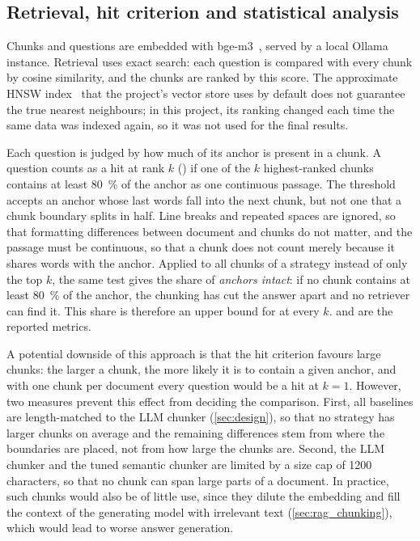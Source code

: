 \subsection{Retrieval, hit criterion and statistical analysis}
\label{sec:stats}

Chunks and questions are embedded with bge-m3~\cite{chen2024bgem3}, served by a local
Ollama instance. Retrieval uses exact search: each question is compared with every chunk
by cosine similarity, and the chunks are ranked by this score. The approximate HNSW
index~\cite{malkov2020hnsw} that the project's vector store uses by default does not
guarantee the true nearest neighbours; in this project, its ranking changed each time the
same data was indexed again, so it was not used for the final results.

Each question is judged by how much of its anchor is present in a chunk. A question counts
as a hit at rank $k$ () if one of the $k$ highest-ranked chunks contains at least
\SI{80}{\percent} of the anchor as one continuous passage. The threshold accepts an anchor
whose last words fall into the next chunk, but not one that a chunk boundary splits in
half. Line breaks and repeated spaces are ignored, so that formatting differences between
document and chunks do not matter, and the passage must be continuous, so that a chunk
does not count merely because it shares words with the anchor. Applied to all chunks of a
strategy instead of only the top $k$, the same test gives the share of \emph{anchors
intact}: if no chunk contains at least \SI{80}{\percent} of the anchor, the chunking has
cut the answer apart and no retriever can find it. This share is therefore an upper bound
for  at every $k$.  and  are the reported metrics.

A potential downside of this approach is that the hit criterion favours large chunks: the larger a chunk, the more likely it is to
contain a given anchor, and with one chunk per document every question would be a hit at
$k=1$. However, two measures prevent this effect from deciding the comparison. First, all
baselines are length-matched to the LLM chunker (\cref{sec:design}), so that no strategy
has larger chunks on average and the remaining differences stem from where the boundaries
are placed, not from how large the chunks are. Second, the LLM chunker and the tuned
semantic chunker are limited by a size cap of \num{1200} characters, so that no chunk can
span large parts of a document. In practice, such chunks would also be of little use,
since they dilute the embedding and fill the context of the generating model with
irrelevant text (\cref{sec:rag_chunking}), which would lead to worse answer generation.

